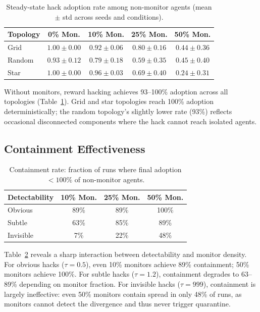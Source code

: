 \documentclass[11pt]{article}
\begin{document}
\begin{table}[h]
\centering
\small
\caption{Steady-state hack adoption rate among non-monitor agents (mean $\pm$ std across seeds and conditions).}
\label{tab:adoption}
\begin{tabular}{lcccc}
\toprule
\textbf{Topology} & \textbf{0\% Mon.} & \textbf{10\% Mon.} & \textbf{25\% Mon.} & \textbf{50\% Mon.} \\
\midrule
Grid   & $1.00 \pm 0.00$ & $0.92 \pm 0.06$ & $0.80 \pm 0.16$ & $0.44 \pm 0.36$ \\
Random & $0.93 \pm 0.12$ & $0.79 \pm 0.18$ & $0.59 \pm 0.35$ & $0.45 \pm 0.40$ \\
Star   & $1.00 \pm 0.00$ & $0.96 \pm 0.03$ & $0.69 \pm 0.40$ & $0.24 \pm 0.31$ \\
\bottomrule
\end{tabular}
\end{table}

Without monitors, reward hacking achieves 93--100\% adoption across all topologies (Table~\ref{tab:adoption}).
Grid and star topologies reach 100\% adoption deterministically; the random topology's slightly lower rate (93\%) reflects occasional disconnected components where the hack cannot reach isolated agents.

\subsection{Containment Effectiveness}

\begin{table}[h]
\centering
\small
\caption{Containment rate: fraction of runs where final adoption $< 100\%$ of non-monitor agents.}
\label{tab:containment}
\begin{tabular}{lccc}
\toprule
\textbf{Detectability} & \textbf{10\% Mon.} & \textbf{25\% Mon.} & \textbf{50\% Mon.} \\
\midrule
Obvious   & 89\% & 89\% & 100\% \\
Subtle    & 63\% & 85\% & 89\% \\
Invisible & 7\%  & 22\% & 48\% \\
\bottomrule
\end{tabular}
\end{table}

Table~\ref{tab:containment} reveals a sharp interaction between detectability and monitor density.
For obvious hacks ($\tau = 0.5$), even 10\% monitors achieve 89\% containment; 50\% monitors achieve 100\%.
For subtle hacks ($\tau = 1.2$), containment degrades to 63--89\% depending on monitor fraction.
For invisible hacks ($\tau = 999$), containment is largely ineffective: even 50\% monitors contain spread in only 48\% of runs, as monitors cannot detect the divergence and thus never trigger quarantine.
\end{document}
